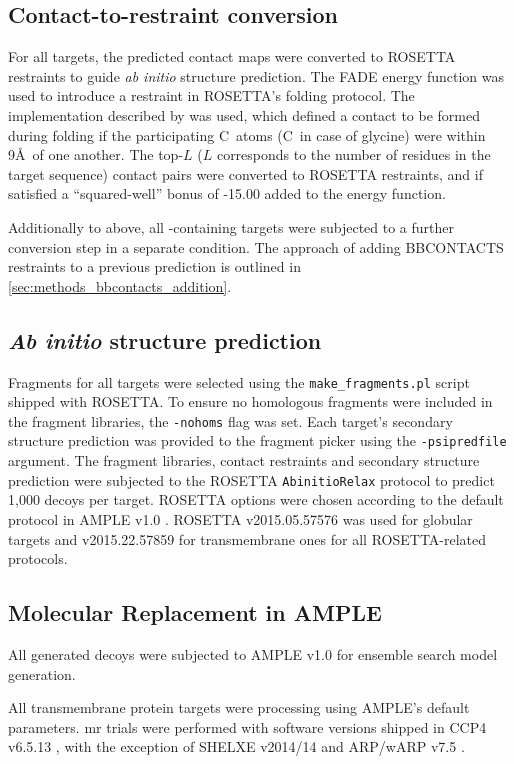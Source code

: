\subsection{Contact-to-restraint conversion} \label{sec:bbcontacts_addition}
For all targets, the predicted contact maps were converted to ROSETTA restraints to guide \textit{ab initio} structure prediction. The FADE energy function was used to introduce a restraint in ROSETTA's folding protocol. The implementation described by \textcite{Michel2014-eg} was used, which defined a contact to be formed during folding if the participating C\textbeta\ atoms (C\textalpha\ in case of glycine) were within 9\AA\ of one another. The top-$L$ ($L$ corresponds to the number of residues in the target sequence) contact pairs were converted to ROSETTA restraints, and if satisfied a ``squared-well'' bonus of -15.00 added to the energy function.

Additionally to above, all \textbeta-containing targets were subjected to a further conversion step in a separate condition. The approach of adding BBCONTACTS restraints to a previous prediction is outlined in \cref{sec:methods_bbcontacts_addition}.

\subsection{\textit{Ab initio} structure prediction}
Fragments for all targets were selected using the \texttt{make\_fragments.pl} script shipped with ROSETTA. To ensure no homologous fragments were included in the fragment libraries, the \texttt{-nohoms} flag was set. Each target's secondary structure prediction was provided to the fragment picker using the \texttt{-psipredfile} argument. The fragment libraries, contact restraints and secondary structure prediction were subjected to the ROSETTA \texttt{AbinitioRelax} protocol \cite{Rohl2004-dj} to predict 1,000 decoys per target. ROSETTA options were chosen according to the default protocol in AMPLE v1.0 \cite{Bibby2012-lm}. ROSETTA v2015.05.57576 was used for globular targets and v2015.22.57859 for transmembrane ones for all ROSETTA-related protocols.
%
\subsection{Molecular Replacement in AMPLE}
All generated decoys were subjected to AMPLE v1.0 \cite{Bibby2012-lm} for ensemble search model generation. 

All transmembrane protein targets were processing using AMPLE's default parameters. \Gls{mr} trials were performed with software versions shipped in CCP4 v6.5.13 \cite{Winn2011-xe}, with the exception of SHELXE v2014/14 \cite{Thorn2013-le} and ARP/wARP v7.5 \cite{Cohen2007-wg}.

